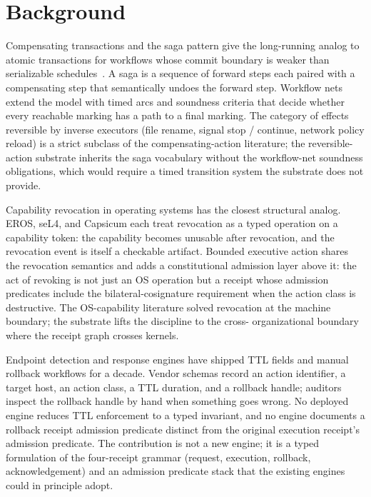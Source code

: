 \section{Background}
\label{sec:background-ra}

Compensating transactions and the saga pattern give the long-running
analog to atomic transactions for workflows whose commit boundary is
weaker than serializable schedules~\cite{garciamolina1987sagas}. A saga is a
sequence of forward steps each paired with a compensating step that
semantically undoes the forward step. Workflow nets extend the model
with timed arcs and soundness criteria that decide whether every
reachable marking has a path to a final marking. The category of effects
reversible by inverse executors (file rename, signal stop / continue,
network policy reload) is a strict subclass of the compensating-action
literature; the reversible-action substrate inherits the saga
vocabulary without the workflow-net soundness obligations, which would
require a timed transition system the substrate does not provide.

Capability revocation in operating systems has the closest structural
analog. EROS, seL4, and Capsicum each treat revocation as a typed
operation on a capability token: the capability becomes unusable after
revocation, and the revocation event is itself a checkable artifact.
Bounded executive action shares the revocation semantics and adds a
constitutional admission layer above it: the act of revoking is not
just an OS operation but a receipt whose admission predicates include
the bilateral-cosignature requirement when the action class is
destructive. The OS-capability literature solved revocation at the
machine boundary; the substrate lifts the discipline to the cross-
organizational boundary where the receipt graph crosses kernels.

Endpoint detection and response engines have shipped TTL fields and
manual rollback workflows for a decade. Vendor schemas record an action
identifier, a target host, an action class, a TTL duration, and a
rollback handle; auditors inspect the rollback handle by hand when
something goes wrong. No deployed engine reduces TTL enforcement to a
typed invariant, and no engine documents a rollback receipt admission
predicate distinct from the original execution receipt's admission
predicate. The contribution is not a new engine; it is a typed
formulation of the four-receipt grammar (request, execution, rollback,
acknowledgement) and an admission predicate stack that the existing
engines could in principle adopt.


